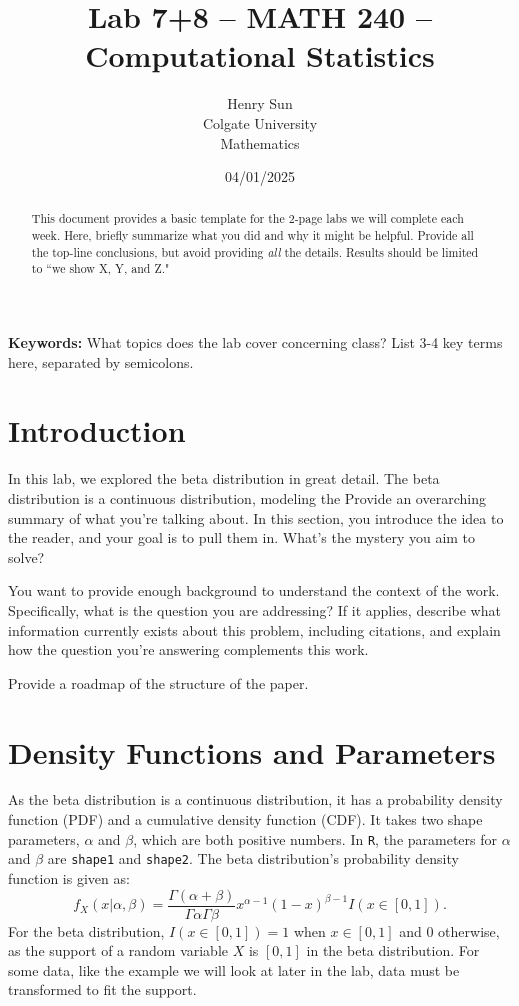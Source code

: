 \documentclass{article}\usepackage[]{graphicx}\usepackage[]{xcolor}
\begin{document}
\vspace{-1in}
\title{Lab 7+8 -- MATH 240 -- Computational Statistics}

\author{
  Henry Sun \\
  Colgate University  \\
  Mathematics  \\
  {\tt }
}

\date{04/01/2025}

\maketitle

\begin{multicols}{2}
\begin{abstract}
This document provides a basic template for the 2-page labs we will complete each week. Here, briefly summarize what you did and why it might be helpful. Provide all the top-line conclusions, but avoid providing \emph{all} the details. Results should be limited to ``we show X, Y, and Z."
\end{abstract}

\noindent \textbf{Keywords:} What topics does the lab cover concerning class? List 3-4 key terms here, separated by semicolons.

\section{Introduction}
In this lab, we explored the beta distribution in great detail. The beta distribution is a continuous distribution, modeling the
Provide an overarching summary of what you're talking about. In this section, you introduce the idea to the reader, and your goal is to pull them in. What's the mystery you aim to solve?

You want to provide enough background to understand the context of the work. Specifically, what is the question you are addressing? If it applies, describe what information currently exists about this problem, including citations, and explain how the question you're answering complements this work.

Provide a roadmap of the structure of the paper. 

\section{Density Functions and Parameters}
As the beta distribution is a continuous distribution, it has a probability density function (PDF) and a cumulative density function (CDF). It takes two shape parameters, $\alpha$ and $\beta$, which are both positive numbers. In \texttt{R}, the parameters for $\alpha$ and $\beta$ are \texttt{shape1} and \texttt{shape2}. The beta distribution's probability density function is given as:
 \[f_X(x|\alpha, \beta) = \frac{\Gamma(\alpha + \beta)}{\Gamma\alpha\Gamma\beta} x^{\alpha-1}(1-x)^{\beta-1}I(x \in [0,1]).\]
For the beta distribution, $I(x \in [0,1]) = 1$ when $x \in [0,1]$ and $0$ otherwise, as the support of a random variable $X$ is $[0,1]$ in the beta distribution. For some data, like the example we will look at later in the lab, data must be transformed to fit the support. 


\end{multicols}
\end{document}
